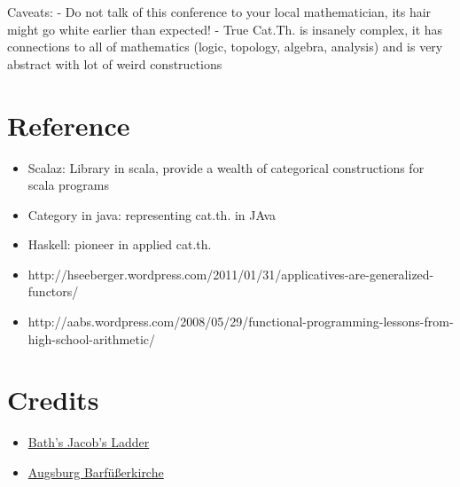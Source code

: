 \documentclass{article}
\begin{document}
Caveats: - Do not talk of this conference to your local mathematician,
its hair might go white earlier than expected! - True Cat.Th. is
insanely complex, it has connections to all of mathematics (logic,
topology, algebra, analysis) and is very abstract with lot of weird
constructions

\section{Reference}

\begin{itemize}
\item
  Scalaz: Library in scala, provide a wealth of categorical
  constructions for scala programs
\item
  Category in java: representing cat.th. in JAva
\item
  Haskell: pioneer in applied cat.th.
\item
  http://hseeberger.wordpress.com/2011/01/31/applicatives-are-generalized-functors/
\item
  http://aabs.wordpress.com/2008/05/29/functional-programming-lessons-from-high-school-arithmetic/
\end{itemize}
\section{Credits}

\begin{itemize}
\item
  \href{http://en.wikipedia.org/wiki/File:Himnastigi.jpg}{Bath's Jacob's
  Ladder}
\item
  \href{http://upload.wikimedia.org/wikipedia/commons/thumb/a/ad/Augsburg\_Barf\%C3\%BC\%C3\%9Ferkirche\_013.jpg/822px-Augsburg\_Barf\%C3\%BC\%C3\%9Ferkirche\_013.jpg}{Augsburg
  Barfüßerkirche}
\end{itemize}
\end{document}
